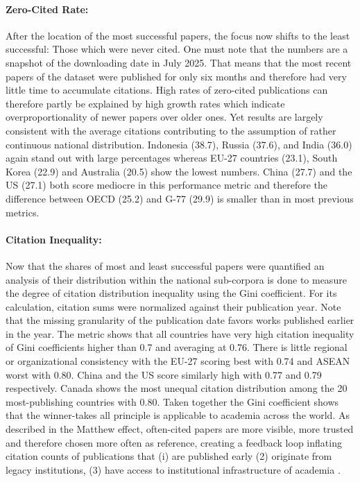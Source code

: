 \documentclass{article}
\begin{document}
	\paragraph{Zero-Cited Rate:} After the location of the most successful papers, the focus now shifts to the least successful: Those which were never cited. One must note that the numbers are a snapshot of the downloading date in July 2025. That means that the most recent papers of the dataset were published for only six months and therefore had very little time to accumulate citations. High rates of zero-cited publications can therefore partly be explained by high growth rates which indicate overproportionality of newer papers over older ones. Yet results are largely consistent with the average citations contributing to the assumption of rather continuous national distribution. Indonesia (38.7), Russia (37.6), and India (36.0) again stand out with large percentages whereas EU-27 countries (23.1), South Korea (22.9) and Australia (20.5) show the lowest numbers. China (27.7) and the US (27.1) both score mediocre in this performance metric and therefore the difference between OECD (25.2) and G-77 (29.9) is smaller than in most previous metrics.
	
	\paragraph{Citation Inequality:} Now that the shares of most and least successful papers were quantified an analysis of their distribution within the national sub-corpora is done to measure the degree of citation distribution inequality using the Gini coefficient. For its calculation, citation sums were normalized against their publication year. Note that the missing granularity of the publication date favors works published earlier in the year. The metric shows that all countries have very high citation inequality of Gini coefficients higher than 0.7 and averaging at 0.76. There is little regional or organizational consistency with the EU-27 scoring best with 0.74 and ASEAN worst with 0.80. China and the US score similarly high with 0.77 and 0.79 respectively. Canada shows the most unequal citation distribution among the 20 most-publishing countries with 0.80. Taken together the Gini coefficient shows that the winner-takes all principle is applicable to academia across the world. As described in the Matthew effect, often-cited papers are more visible, more trusted and therefore chosen more often as reference, creating a feedback loop inflating citation counts of publications that (i) are published early (2) originate from legacy institutions, (3) have access to institutional infrastructure of academia \cite{Merton1968}.
	
\end{document}
